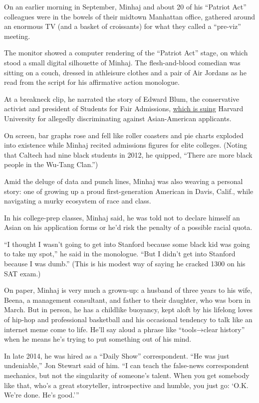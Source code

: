 On an earlier morning in September, Minhaj and about 20 of his ``Patriot
Act'' colleagues were in the bowels of their midtown Manhattan office,
gathered around an enormous TV (and a basket of croissants) for what
they called a ``pre-viz'' meeting.

The monitor showed a computer rendering of the ``Patriot Act'' stage, on
which stood a small digital silhouette of Minhaj. The flesh-and-blood
comedian was sitting on a couch, dressed in athleisure clothes and a
pair of Air Jordans as he read from the script for his affirmative
action monologue.

At a breakneck clip, he narrated the story of Edward Blum, the
conservative activist and president of Students for Fair Admissions,
\href{https://www.nytimes.com/2018/08/30/us/politics/asian-students-affirmative-action-harvard.html}{which
is suing} Harvard University for allegedly discriminating against
Asian-American applicants.

On screen, bar graphs rose and fell like roller coasters and pie charts
exploded into existence while Minhaj recited admissions figures for
elite colleges. (Noting that Caltech had nine black students in 2012, he
quipped, ``There are more black people in the Wu-Tang Clan.'')

Amid the deluge of data and punch lines, Minhaj was also weaving a
personal story: one of growing up a proud first-generation American in
Davis, Calif., while navigating a murky ecosystem of race and class.

In his college-prep classes, Minhaj said, he was told not to declare
himself an Asian on his application forms or he'd risk the penalty of a
possible racial quota.

``I thought I wasn't going to get into Stanford because some black kid
was going to take my spot,'' he said in the monologue. ``But I didn't
get into Stanford because I was dumb.'' (This is his modest way of
saying he cracked 1300 on his SAT exam.)

On paper, Minhaj is very much a grown-up: a husband of three years to
his wife, Beena, a management consultant, and father to their daughter,
who was born in March. But in person, he has a childlike buoyancy, kept
aloft by his lifelong loves of hip-hop and professional basketball and
his occasional tendency to talk like an internet meme come to life.
He'll say aloud a phrase like ``tools→clear history'' when he means he's
trying to put something out of his mind.

In late 2014, he was hired as a ``Daily Show'' correspondent. ``He was
just undeniable,'' Jon Stewart said of him. ``I can teach the false-news
correspondent mechanics, but not the singularity of someone's talent.
When you get somebody like that, who's a great storyteller,
introspective and humble, you just go: `O.K. We're done. He's good.'''

